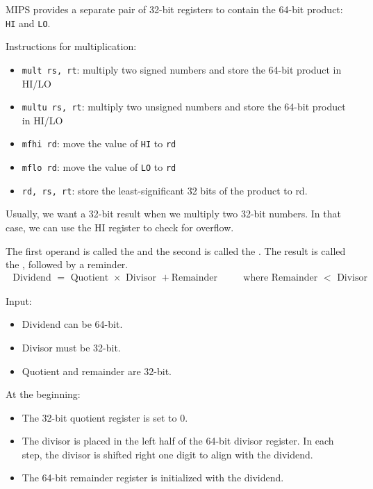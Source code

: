     \par MIPS provides a separate pair of 32-bit registers to contain the
    64-bit product: \lstinline{HI} and \lstinline{LO}.
    \par Instructions for multiplication:
      \begin{itemize}
        \item \lstinline{mult rs, rt}: multiply two signed numbers and store the
          64-bit product in HI/LO
        \item \lstinline{multu rs, rt}: multiply two unsigned numbers and store the
          64-bit product in HI/LO
        \item \lstinline{mfhi rd}: move the value of \lstinline{HI} to \lstinline{rd}
        \item \lstinline{mflo rd}: move the value of \lstinline{LO} to \lstinline{rd}
        \item \lstinline{rd, rs, rt}: store the least-significant 32 bits of
          the product to rd.
      \end{itemize}
    \par Usually, we want a 32-bit result when we multiply two 32-bit numbers.
    In that case, we can use the HI register to check for overflow.

    \par The first operand is called the  and the second is called
    the . The result is called the , followed by a
    reminder.
    \begin{align*}
      \mbox{ Dividend } = \mbox{ Quotient } \times \mbox{ Divisor } + \mbox{
        Remainder } \qquad \mbox{ where Remainder } < \mbox{ Divisor }
    \end{align*}


    \par Input:
    \begin{itemize}
      \item Dividend can be 64-bit.
      \item Divisor must be 32-bit.
      \item Quotient and remainder are 32-bit.
    \end{itemize}
    \par At the beginning:
    \begin{itemize}
      \item The 32-bit quotient register is set to 0.
      \item The divisor is placed in the left half of the 64-bit divisor
        register. In each step, the divisor is shifted right one digit to align
        with the dividend.
      \item The 64-bit remainder register is initialized with the dividend.
    \end{itemize}

